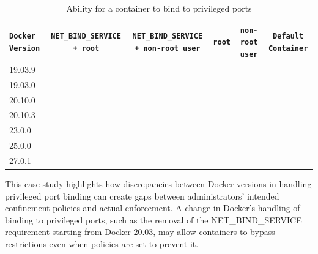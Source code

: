 \documentclass[12pt]{report}
\newcommand{\cmark}{\ding{51}} \newcommand{\xmark}{\ding{55}} \newcommand{\etal}{et~al.\ }
\begin{document}
\begin{doublespace}
\begin{table}
    \centering
    \caption{Ability for a container to bind to privileged ports}
    \label{tab:port-binding-pre-20.03}
    \scriptsize
    \begin{tabular}{|p{2.5cm}|c|c|c|c|c|}
        \hline
        \texttt{Docker Version} & \texttt{NET\_BIND\_SERVICE + root} & \texttt{NET\_BIND\_SERVICE + non-root user} & \texttt{root} & \texttt{non-root user} & \texttt{Default Container} \\ \hline
        19.03.9                & \cmark                         & \xmark                               & \xmark      & \xmark           & \xmark                                      \\ \hline
        19.03.0                & \cmark                         & \xmark                               & \xmark      & \xmark           & \xmark                                      \\ \hline
        20.10.0                & \cmark                         & \xmark                              & \xmark      & \xmark           & \xmark                                      \\ \hline
        20.10.3                & \cmark                         & \xmark                              & \xmark      & \xmark           & \xmark                                      \\ \hline
        23.0.0                 & \cmark                         & \cmark                              & \cmark      & \xmark           & \xmark                                      \\ \hline
        25.0.0                 & \cmark                         & \cmark                              & \cmark      & \xmark           & \xmark                                      \\ \hline
        27.0.1                 & \cmark                         & \cmark                              & \cmark      & \xmark           & \xmark                                      \\ \hline
    \end{tabular}
\end{table}

This case study highlights how discrepancies between Docker versions in handling privileged port binding can create gaps between administrators' intended confinement policies and actual enforcement. A change in Docker's handling of binding to privileged ports, such as the removal of the NET\_BIND\_SERVICE requirement starting from Docker 20.03, may allow containers to bypass restrictions even when policies are set to prevent it. 


\end{doublespace}
\end{document}
